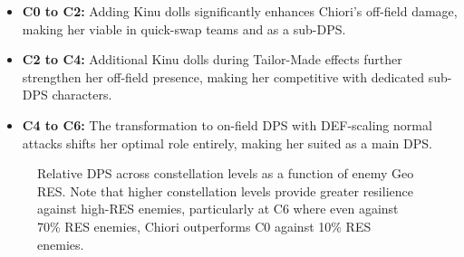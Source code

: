 \documentclass[12pt,a4paper]{article}
\begin{document}
\begin{itemize}
    \item \textbf{C0 to C2:} Adding Kinu dolls significantly enhances Chiori's off-field damage, making her viable in quick-swap teams and as a sub-DPS.
    \item \textbf{C2 to C4:} Additional Kinu dolls during Tailor-Made effects further strengthen her off-field presence, making her competitive with dedicated sub-DPS characters.
    \item \textbf{C4 to C6:} The transformation to on-field DPS with DEF-scaling normal attacks shifts her optimal role entirely, making her suited as a main DPS.
\end{itemize}

\begin{figure}[H]
\centering
{}
\caption{Relative DPS across constellation levels as a function of enemy Geo RES. Note that higher constellation levels provide greater resilience against high-RES enemies, particularly at C6 where even against 70\% RES enemies, Chiori outperforms C0 against 10\% RES enemies.}
\label{fig:constellation_res_performance}
\end{figure}
\end{document}
